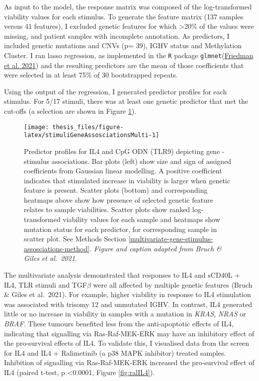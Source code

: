\documentclass[11pt, a4paper, twosided]{book}
\begin{document}
As input to the model, the response matrix was composed of the log-transformed viability values for each stimulus. To generate the feature matrix (137 samples versus 41 features), I excluded genetic features for which \textgreater20\% of the values were missing, and patient samples with incomplete annotation. As predictors, I included genetic mutations and CNVs (p= 39), IGHV status and Methylation Cluster. I ran lasso regression, as implemented in the \texttt{R} package \texttt{glmnet}(\protect\hyperlink{ref-R-glmnet}{Friedman et al. 2021}) and the resulting predictors are the mean of those coefficients that were selected in at least 75\% of 30 bootstrapped repeats.

Using the output of the regression, I generated predictor profiles for each stimulus. For 5/17 stimuli, there was at least one genetic predictor that met the cut-offs (a selection are shown in Figure \ref{fig:stimuliGeneAssosciationsMulti}).


\begin{figure}

{\centering \texttt{[image: thesis\_files/figure-latex/stimuliGeneAssosciationsMulti-1]} 

}

\caption{Predictor profiles for IL4 and CpG ODN (TLR9) depicting gene - stimulus associations. Bar plots (left) show size and sign of assigned coefficients from Gaussian linear modelling. A positive coefficient indicates that stimulated increase in viability is larger when genetic feature is present. Scatter plots (bottom) and corresponding heatmaps above show how presence of selected genetic feature relates to sample viabilities. Scatter plots show ranked log-transformed viability values for each sample and heatmaps show mutation status for each predictor, for corresponding sample in scatter plot. See Methods Section \ref{multivariate-gene-stimulus-assosciations-method}. \emph{Figure and caption adapted from Bruch \& Giles et al.~2021}.}\label{fig:stimuliGeneAssosciationsMulti}
\end{figure}
The multivariate analysis demonstrated that responses to IL4 and sCD40L + IL4, TLR stimuli and TGF\(\beta\) were all affected by multiple genetic features (Bruch \& Giles et al.~2021). For example, higher viability in response to IL4 stimulation was associated with trisomy 12 and unmutated IGHV. In contrast, IL4 generated little or no increase in viability in samples with a mutation in \emph{KRAS}, \emph{NRAS} or \emph{BRAF.} These tumours benefited less from the anti-apoptotic effects of IL4, indicating that signalling via Ras-Raf-MEK-ERK may have an inhibitory effect of the pro-survival effects of IL4. To validate this, I visualised data from the screen for IL4 and IL4 + Ralimetinib (a p38 MAPK inhibitor) treated samples. Inhibition of signalling via Ras-Raf-MEK-ERK increased the pro-survival effect of IL4 (paired t-test, p \textless0.0001, Figure \ref{fig:ralIL4}).
\end{document}
